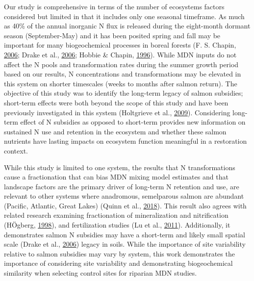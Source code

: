 \documentclass [11pt, proquest] {uwthesis}[2015/03/03]
\begin{document}
Our study is comprehensive in terms of the number of ecosystems factors
considered but limited in that it includes only one seasonal timeframe.
As much as 40\% of the annual inorganic N flux is released during the
eight-month dormant season (September-May) and it has been posited
spring and fall may be important for many biogeochemical processes in
boreal forests (F. S. Chapin, \protect\hyperlink{ref-Chapin2006}{2006};
Drake et al., \protect\hyperlink{ref-Drake2006}{2006}; Hobbie \& Chapin,
\protect\hyperlink{ref-Hobbie1996}{1996}). While MDN inputs do not
affect the N pools and transformation rates during the summer growth
period based on our results, N concentrations and transformations may be
elevated in this system on shorter timescales (weeks to months after
salmon return). The objective of this study was to identify the
long-term legacy of salmon subsidies; short-term effects were both
beyond the scope of this study and have been previously investigated in
this system (Holtgrieve et al.,
\protect\hyperlink{ref-Holtgrieve2009}{2009}). Considering long-term
effect of N subsidies as opposed to short-term provides new information
on sustained N use and retention in the ecosystem and whether these
salmon nutrients have lasting impacts on ecosystem function meaningful
in a restoration context.

While this study is limited to one system, the results that N
transformations cause a fractionation that can bias MDN mixing model
estimates and that landscape factors are the primary driver of long-term
N retention and use, are relevant to other systems where anadromous,
semelparous salmon are abundant (Pacific, Atlantic, Great Lakes) (Quinn
et al., \protect\hyperlink{ref-Quinn2018}{2018}). This result also
agrees with related research examining fractionation of mineralization
and nitrification (HÖgberg, \protect\hyperlink{ref-Hogberg1998}{1998}),
and fertilization studies (Lu et al.,
\protect\hyperlink{ref-Lu2011}{2011}). Additionally, it demonstrates
salmon N subsidies may have a short-term and likely small spatial scale
(Drake et al., \protect\hyperlink{ref-Drake2006}{2006}) legacy in soils.
While the importance of site variability relative to salmon subsidies
may vary by system, this work demonstrates the importance of considering
site variability and demonstrating biogeochemical similarity when
selecting control sites for riparian MDN studies.
\end{document}
